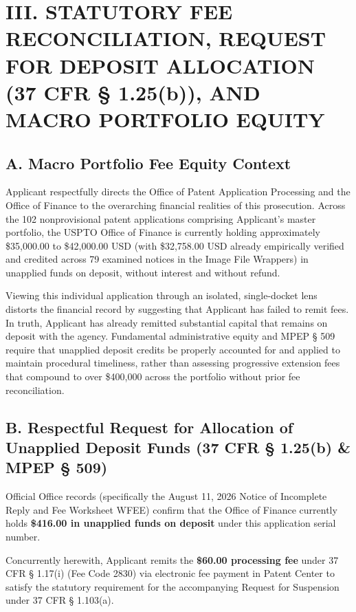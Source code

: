 \documentclass[11pt,letterpaper]{article}
\begin{document}
\section*{III. STATUTORY FEE RECONCILIATION, REQUEST FOR DEPOSIT ALLOCATION (37 CFR \S{} 1.25(b)), AND MACRO PORTFOLIO EQUITY}

\subsection*{A. Macro Portfolio Fee Equity Context}
Applicant respectfully directs the Office of Patent Application Processing and the Office of Finance to the overarching financial realities of this prosecution. Across the 102 nonprovisional patent applications comprising Applicant's master portfolio, the USPTO Office of Finance is currently holding approximately \$35,000.00 to \$42,000.00 USD (with \$32,758.00 USD already empirically verified and credited across 79 examined notices in the Image File Wrappers) in unapplied funds on deposit, without interest and without refund.

Viewing this individual application through an isolated, single-docket lens distorts the financial record by suggesting that Applicant has failed to remit fees. In truth, Applicant has already remitted substantial capital that remains on deposit with the agency. Fundamental administrative equity and MPEP \S{} 509 require that unapplied deposit credits be properly accounted for and applied to maintain procedural timeliness, rather than assessing progressive extension fees that compound to over \$400,000 across the portfolio without prior fee reconciliation.

\subsection*{B. Respectful Request for Allocation of Unapplied Deposit Funds (37 CFR \S{} 1.25(b) \& MPEP \S{} 509)}
Official Office records (specifically the August 11, 2026 Notice of Incomplete Reply and Fee Worksheet WFEE) confirm that the Office of Finance currently holds \textbf{\$416.00 in unapplied funds on deposit} under this application serial number.

Concurrently herewith, Applicant remits the \textbf{\$60.00 processing fee} under 37 CFR \S{} 1.17(i) (Fee Code 2830) via electronic fee payment in Patent Center to satisfy the statutory requirement for the accompanying Request for Suspension under 37 CFR \S{} 1.103(a).
\end{document}
